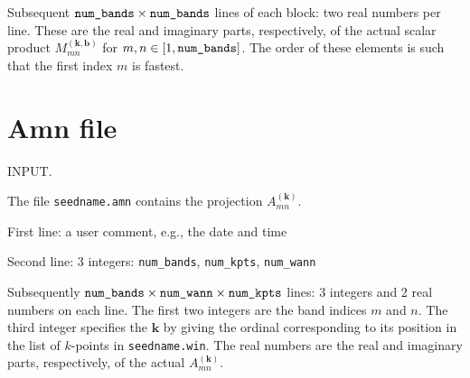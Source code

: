 Subsequent $\verb#num_bands#\times\verb#num_bands#$ lines of each
block: two real numbers per line. These are the real and imaginary
parts, respectively, of the actual scalar product
$M_{mn}^{(\mathbf{k,b})}$ for $m,n \in [1,\verb#num_bands#]$. The
order of these elements is such that the first index $m$ is fastest.


\section{Amn file}

INPUT.

The file \verb#seedname.amn# contains the projection
$A_{mn}^{(\mathbf{k})}$.

First line: a user comment, e.g., the date and time


Second line: 3 integers: \verb#num_bands#, \verb#num_kpts#, \verb#num_wann#

                                     
Subsequently
$\verb#num_bands#\times\verb#num_wann#\times\verb#num_kpts#$ 
lines: 3 integers and 2 real numbers on each line. The first 
two integers are the band indices $m$ and $n$. The third integer specifies
the $\mathbf{k}$ by giving the ordinal corresponding to its position
in the list of $k$-points in \verb#seedname.win#. The real numbers
are the real and imaginary parts, respectively, of the actual
$A_{mn}^{(\mathbf{k})}$.



